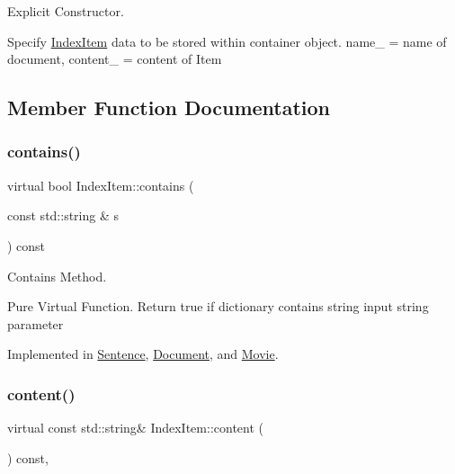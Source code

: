 Explicit Constructor. 

Specify \hyperlink{class_index_item}{Index\+Item} data to be stored within container object. name\+\_\+ = name of document, content\+\_\+ = content of Item 

\subsection{Member Function Documentation}
\mbox{\label{class_index_item_a534d96bf041a485ed124663b9cded2fb}} 
\subsubsection{\texorpdfstring{contains()}{contains()}}
{\footnotesize\ttfamily virtual bool Index\+Item\+::contains (\begin{DoxyParamCaption}\item[{const std\+::string \&}]{s }\end{DoxyParamCaption}) const\hspace{0.3cm}{\ttfamily [pure virtual]}}



Contains Method. 

Pure Virtual Function. Return true if dictionary contains string input string parameter 

Implemented in \hyperlink{class_sentence_a867c17dbf3ef55c8708faa120ffad162}{Sentence}, \hyperlink{class_document_a68e12b27c40699cd3c2fff66a6161473}{Document}, and \hyperlink{class_movie_ad6ee4833582077b9a6543ba574343005}{Movie}.

\mbox{\label{class_index_item_a2b5b4451bcb2fd50328bdc5b470d6296}} 
\subsubsection{\texorpdfstring{content()}{content()}}
{\footnotesize\ttfamily virtual const std\+::string\& Index\+Item\+::content (\begin{DoxyParamCaption}{ }\end{DoxyParamCaption}) const\hspace{0.3cm}{\ttfamily [inline]}, {\ttfamily [virtual]}}



